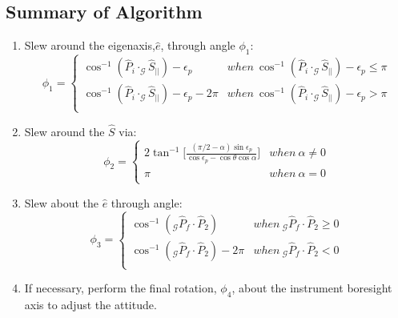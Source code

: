 \documentclass[letterpaper, paper,12pt]{AAS}		%
\begin{document}
	\subsection{Summary of Algorithm} 	
	\begin{enumerate}
		\item Slew around the eigenaxis,$\hat{e}$, through angle $\phi_1$:		
		\begin{equation}\label{phi1}
		\phi_1=\left\{
		\begin{array}{ll}
		\cos^{-1}(\hat{P}_i\cdot_\mathcal{G}\hat{S}_{||})-\epsilon_p& when\  \cos^{-1}(\hat{P}_i\cdot_\mathcal{G}\hat{S}_{||})-\epsilon_p\leq \pi\\
		\cos^{-1}(\hat{P}_i\cdot_\mathcal{G}\hat{S}_{||})-\epsilon_p-2\pi& when\ \cos^{-1}(\hat{P}_i\cdot_\mathcal{G}\hat{S}_{||})-\epsilon_p>\pi\\
		\end{array}
		\right.
		\end{equation}
		\item Slew around the $\hat{S}$ via:
		\begin{equation}\label{phi2}
		\phi_2=\left\{
		\begin{array}{ll}
		2\tan^{-1}\Big[ \frac{(\pi/2-\alpha)\sin\epsilon_p}{\cos\epsilon_p-\cos\theta\cos\alpha}\Big]& when\  \alpha\neq 0\\
		\pi& when\ \alpha=0\\
		\end{array}
		\right.
		\end{equation}
		\item Slew about the $\hat{e}$ through angle:
		\begin{equation}\label{phi3}
		\phi_3=\left\{
		\begin{array}{ll}
		\cos^{-1}(_\mathcal{G}\hat{P}_f\cdot\hat{P}_2)& when\  _\mathcal{G}\hat{P}_f\cdot\hat{P}_2\geq 0\\
		\cos^{-1}(_\mathcal{G}\hat{P}_f\cdot\hat{P}_2)-2\pi& when\ _\mathcal{G}\hat{P}_f\cdot\hat{P}_2<0\\
		\end{array}
		\right.
		\end{equation}		
		\item If necessary, perform the final rotation, $\phi_4$, about the instrument boresight axis to adjust the attitude. 
	\end{enumerate}
	
	
\end{document}
